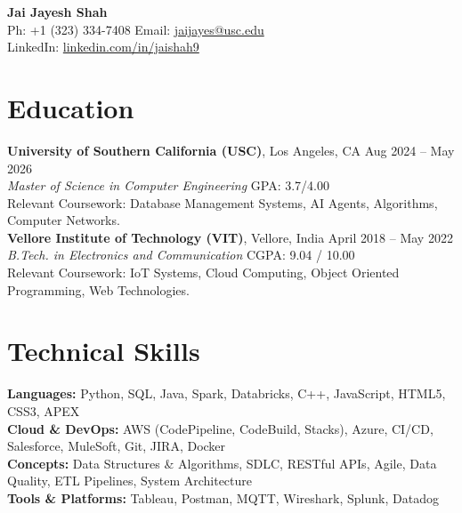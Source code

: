 \documentclass[letterpaper,10pt]{article}
\begin{document}
\begin{center}
    {\LARGE \textbf{Jai Jayesh Shah}} \\
    \vspace{4pt}
    \small
    Ph: +1 (323) 334-7408 \quad Email: \href{mailto:jaijayes@usc.edu}{jaijayes@usc.edu} \\
    LinkedIn: \href{https://www.linkedin.com/in/jaishah9}{linkedin.com/in/jaishah9} \\
    \vspace{-10pt}
\end{center}

\section*{Education}
    \textbf{University of Southern California (USC)}, Los Angeles, CA \hfill Aug 2024 -- May 2026 \\
    \textit{Master of Science in Computer Engineering} \hfill GPA: 3.7/4.00 \\
    Relevant Coursework: Database Management Systems, AI Agents, Algorithms, Computer Networks. \\

    \vspace{2pt}
    \textbf{Vellore Institute of Technology (VIT)}, Vellore, India \hfill April 2018 -- May 2022 \\
    \textit{B.Tech. in Electronics and Communication} \hfill CGPA: 9.04 / 10.00 \\
    Relevant Coursework: IoT Systems, Cloud Computing, Object Oriented Programming, Web Technologies.

\section*{Technical Skills}
    \textbf{Languages:} Python, SQL, Java, Spark, Databricks, C++, JavaScript, HTML5, CSS3, APEX \\
    \textbf{Cloud \& DevOps:} AWS (CodePipeline, CodeBuild, Stacks), Azure, CI/CD, Salesforce, MuleSoft, Git, JIRA, Docker \\
    \textbf{Concepts:} Data Structures \& Algorithms, SDLC, RESTful APIs, Agile, Data Quality, ETL Pipelines, System Architecture \\
    \textbf{Tools \& Platforms:} Tableau, Postman, MQTT, Wireshark, Splunk, Datadog

\end{document}
